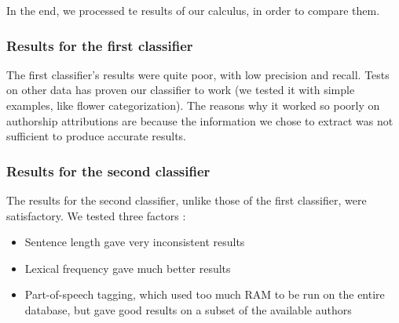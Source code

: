 In the end, we processed te results of our calculus, in order to compare them.

\subsubsection {Results for the first classifier}

The first classifier's results were quite poor, with low precision and recall.
Tests on other data has proven our classifier to work (we tested it with simple examples, like flower categorization).
The reasons why it worked so poorly on authorship attributions are because the information we chose to extract was not sufficient to produce accurate results.


\subsubsection {Results for the second classifier}

The results for the second classifier, unlike those of the first classifier, were satisfactory.
We tested three factors : 
\begin{itemize}
	\item Sentence length  gave very inconsistent results
	\item Lexical frequency gave much better results
	\item Part-of-speech tagging, which used too much RAM to be run on the entire database, but gave good results on a subset of the available authors
\end{itemize}
